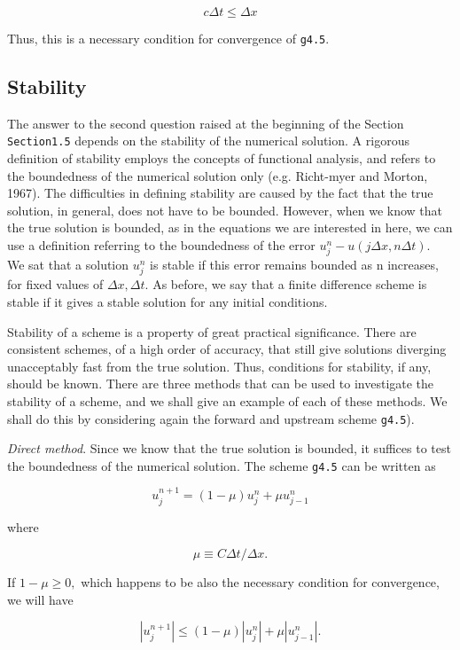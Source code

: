     {\[c\Delta t \leq \Delta x\]}

Thus, this is a necessary condition for convergence of \texttt{g4.5}.

\subsection{\texorpdfstring{\textbf{Stability}}{Stability}}\label{stability}

The answer to the second question raised at the beginning of the
Section \texttt{Section1.5} depends on the stability of the numerical
solution. A rigorous definition of stability employs the concepts of
functional analysis, and refers to the boundedness of the numerical
solution only (e.g. Richt-myer and Morton, 1967). The difficulties in
defining stability are caused by the fact that the true solution, in
general, does not have to be bounded. However, when we know that the
true solution is bounded, as in the equations we are interested in here,
we can use a definition referring to the boundedness of the error
\(u_{j}^{n} - u\left( j\Delta x,n\Delta t \right)\text{. }\) We sat that
a solution \(u_{j}^{n}\) is stable if this error remains bounded as n
increases, for fixed values of \(\Delta x,\Delta t.\) As before, we say
that a finite difference scheme is stable if it gives a stable solution
for any initial conditions.

Stability of a scheme is a property of great practical significance.
There are consistent schemes, of a high order of accuracy, that still
give solutions diverging unacceptably fast from the true solution. Thus,
conditions for stability, if any, should be known. There are three
methods that can be used to investigate the stability of a scheme, and
we shall give an example of each of these methods. We shall do this by
considering again the forward and upstream scheme \texttt{g4.5}).

\emph{Direct method}. Since we know that the true solution is bounded,
it suffices to test the boundedness of the numerical solution. The
scheme \texttt{g4.5} can be written as

    {\[u_{j}^{n + 1} = \left( 1 - \mu \right)u_{j}^{n}+ \mu u_{j - 1}^{n}\]}

where

\[\mu \equiv C\Delta t/\Delta x.\]

If \(1 - \mu \geq 0,\) which happens to be also the necessary condition
for convergence, we will have

    {\[\left| u_{j}^{n + 1} \right| \leq \left( 1 - \mu \right)\left| u_{j}^{n} \right| + \mu\left| u_{j - 1}^{n} \right|.\]}

